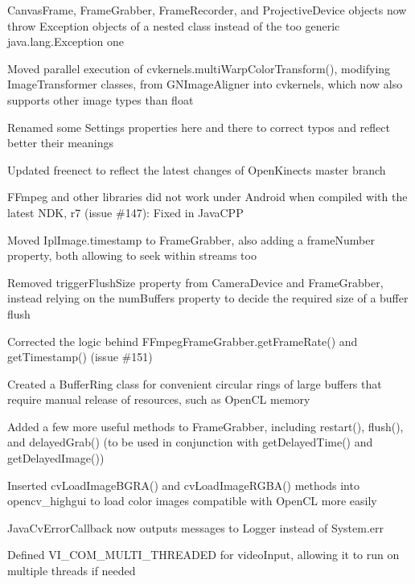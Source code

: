 \begin{DoxyItemize}
\item {\ttfamily Canvas\+Frame}, {\ttfamily Frame\+Grabber}, {\ttfamily Frame\+Recorder}, and {\ttfamily Projective\+Device} objects now throw {\ttfamily Exception} objects of a nested class instead of the too generic {\ttfamily java.\+lang.\+Exception} one
\item Moved parallel execution of {\ttfamily cvkernels.\+multi\+Warp\+Color\+Transform()}, modifying {\ttfamily Image\+Transformer} classes, from {\ttfamily G\+N\+Image\+Aligner} into {\ttfamily cvkernels}, which now also supports other image types than {\ttfamily float}
\item Renamed some {\ttfamily Settings} properties here and there to correct typos and reflect better their meanings
\item Updated {\ttfamily freenect} to reflect the latest changes of Open\+Kinect\textquotesingle{}s master branch
\item F\+Fmpeg and other libraries did not work under Android when compiled with the latest N\+D\+K, r7 (issue \#147)\+: Fixed in Java\+C\+P\+P
\item Moved {\ttfamily Ipl\+Image.\+timestamp} to {\ttfamily Frame\+Grabber}, also adding a {\ttfamily frame\+Number} property, both allowing to seek within streams too
\item Removed {\ttfamily trigger\+Flush\+Size} property from {\ttfamily Camera\+Device} and {\ttfamily Frame\+Grabber}, instead relying on the {\ttfamily num\+Buffers} property to decide the required size of a buffer flush
\item Corrected the logic behind {\ttfamily F\+Fmpeg\+Frame\+Grabber.\+get\+Frame\+Rate()} and {\ttfamily get\+Timestamp()} (issue \#151)
\item Created a {\ttfamily Buffer\+Ring} class for convenient circular rings of large buffers that require manual release of resources, such as Open\+C\+L memory
\item Added a few more useful methods to {\ttfamily Frame\+Grabber}, including {\ttfamily restart()}, {\ttfamily flush()}, and {\ttfamily delayed\+Grab()} (to be used in conjunction with {\ttfamily get\+Delayed\+Time()} and {\ttfamily get\+Delayed\+Image()})
\item Inserted {\ttfamily cv\+Load\+Image\+B\+G\+R\+A()} and {\ttfamily cv\+Load\+Image\+R\+G\+B\+A()} methods into {\ttfamily opencv\+\_\+highgui} to load color images compatible with Open\+C\+L more easily
\item {\ttfamily Java\+Cv\+Error\+Callback} now outputs messages to {\ttfamily Logger} instead of {\ttfamily System.\+err}
\item Defined {\ttfamily V\+I\+\_\+\+C\+O\+M\+\_\+\+M\+U\+L\+T\+I\+\_\+\+T\+H\+R\+E\+A\+D\+E\+D} for {\ttfamily video\+Input}, allowing it to run on multiple threads if needed
\end{DoxyItemize}

